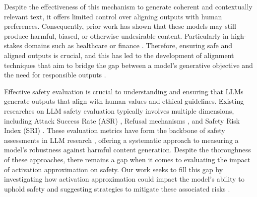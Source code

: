 
Despite the effectiveness of this mechanism to generate coherent and contextually relevant text, it offers limited control over aligning outputs with human preferences. Consequently, prior work \cite{chao2023jailbreaking,zou2023universal,yu2023gptfuzzer,wang2024detoxifying,zhao2024defending} has shown that these models may still produce harmful, biased, or otherwise undesirable content. Particularly in high-stakes domains such as healthcare or finance \cite{liu2024demystifying,yao2024survey}. Therefore, ensuring safe and aligned outputs is crucial, and this has led to the development of alignment techniques that aim to bridge the gap between a model's generative objective and the need for responsible outputs \cite{li2022blacklight,shan2024nightshade}.

 Effective safety evaluation is crucial to understanding and ensuring that LLMs generate outputs that align with human values and ethical guidelines. Existing researches on LLM safety evaluation typically involves multiple dimensions, including Attack Success Rate (ASR) \cite{zou2023universal}, Refusal mechanisms \cite{mazeika2024harmbench}, and Safety Risk Index (SRI) \cite{ying2024safebench}. These evaluation metrics have form the backbone of safety assessments in LLM research \cite{deng2024masterkey,zeng2024air,xie2024sorry,gehman2020realtoxicityprompts,shaikh2022second,wang2023not,souly2024strongreject,li2024salad,chu2024comprehensive}, offering a systematic approach to measuring a model's robustness against harmful content generation. Despite the thoroughness of these approaches, there remains a gap when it comes to evaluating the impact of activation approximation on safety. Our work seeks to fill this gap by investigating how activation approximation could impact the model's ability to uphold safety and suggesting strategies to mitigate these associated risks \cite{hu2024efficient,wang2024white,xu2024uncovering,jia2023causality}.

